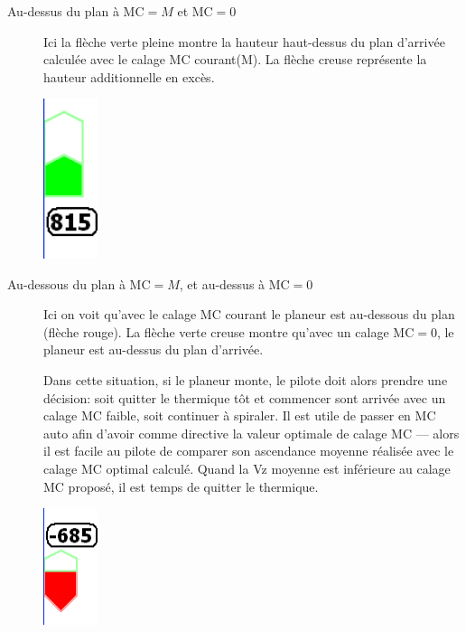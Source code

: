 \begin{description}

\item[Au-dessus du plan à MC$=M$ et MC$=0$]
  Ici la flèche verte pleine montre la hauteur haut-dessus du plan d'arrivée calculée avec le calage MC courant(M). La flèche creuse représente la hauteur additionnelle en excès.

\begin{center}
\includegraphics[angle=0,width=1.6cm,keepaspectratio='true']{figures/fig-finalglide-allabove.png}
\end{center}

\item[Au-dessous du plan à MC$=M$, et au-dessus à MC$=0$]
  Ici on voit qu'avec le calage MC courant le planeur est au-dessous du plan (flèche rouge). La flèche verte creuse montre qu'avec un calage MC$=0$, le planeur est au-dessus du plan d'arrivée.  

Dans cette situation, si le planeur monte, le pilote doit alors prendre une décision: soit quitter le thermique tôt et commencer sont arrivée avec un calage MC faible, soit continuer à spiraler. Il est utile de passer en MC auto afin d'avoir comme directive la valeur optimale de calage MC  --- alors il est facile au pilote de comparer son ascendance moyenne réalisée avec le calage MC optimal calculé. Quand la Vz moyenne est inférieure au calage MC proposé, il est temps de quitter le thermique.

\begin{center}
\includegraphics[angle=0,width=1.6cm,keepaspectratio='true']{figures/fig-finalglide-halfabove.png}
\end{center}


\end{description}
